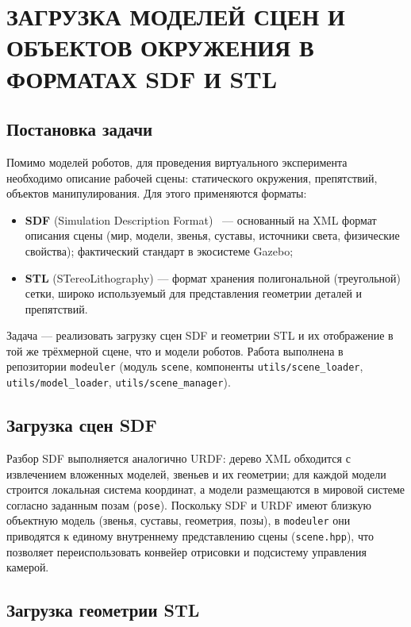 \chapter{ЗАГРУЗКА МОДЕЛЕЙ СЦЕН И ОБЪЕКТОВ ОКРУЖЕНИЯ В ФОРМАТАХ SDF И STL}
\label{cha:sdf}

\section{Постановка задачи}

Помимо моделей роботов, для проведения виртуального эксперимента необходимо
описание рабочей сцены: статического окружения, препятствий, объектов
манипулирования. Для этого применяются форматы:
\begin{itemize}
  \item \textbf{SDF} (Simulation Description Format)~\cite{sdformat} ---
        основанный на XML формат описания сцены (мир, модели, звенья, суставы, источники света, физические
        свойства); фактический стандарт в экосистеме Gazebo;
  \item \textbf{STL} (STereoLithography) --- формат хранения полигональной
        (треугольной) сетки, широко используемый для представления геометрии
        деталей и препятствий.
\end{itemize}

Задача --- реализовать загрузку сцен SDF и геометрии STL и их отображение в той
же трёхмерной сцене, что и модели роботов. Работа выполнена в репозитории
\texttt{modeuler} (модуль \texttt{scene}, компоненты \texttt{utils/scene\_loader},
\texttt{utils/model\_loader}, \texttt{utils/scene\_manager}).

\section{Загрузка сцен SDF}

Разбор SDF выполняется аналогично URDF: дерево XML обходится с извлечением
вложенных моделей, звеньев и их геометрии; для каждой модели строится локальная
система координат, а модели размещаются в мировой системе согласно заданным
позам (\texttt{pose}). Поскольку SDF и URDF имеют близкую объектную модель
(звенья, суставы, геометрия, позы), в \texttt{modeuler} они приводятся к единому
внутреннему представлению сцены (\texttt{scene.hpp}), что позволяет переиспользовать
конвейер отрисовки и подсистему управления камерой.

\section{Загрузка геометрии STL}


